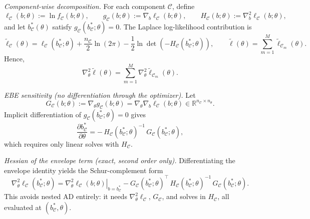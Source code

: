 \documentclass[12pt]{article}
\begin{document}
\medskip
\noindent
\emph{Component-wise decomposition.}
For each component \(\mathcal{C}\), define
\[
\ell_{\mathcal{C}}(b;\theta) := \ln f_{\mathcal{C}}(b;\theta),\qquad
g_{\mathcal{C}}(b;\theta):=\nabla_b \ell_{\mathcal{C}}(b;\theta),\qquad
H_{\mathcal{C}}(b;\theta):=\nabla_b^2 \ell_{\mathcal{C}}(b;\theta),
\]
and let \(b_{\mathcal{C}}^*(\theta)\) satisfy \(g_{\mathcal{C}}(b_{\mathcal{C}}^*;\theta)=0\).
The Laplace log-likelihood contribution is
\[
\tilde\ell_{\mathcal{C}}(\theta)
=
\ell_{\mathcal{C}}(b_{\mathcal{C}}^*;\theta)
+\frac{n_{\mathcal{C}}}{2}\ln(2\pi)
-\frac{1}{2}\ln\det\!\left(-H_{\mathcal{C}}(b_{\mathcal{C}}^*;\theta)\right),
\qquad
\tilde\ell(\theta)=\sum_{m=1}^M \tilde\ell_{\mathcal{C}_m}(\theta).
\]
Hence,
\[
\nabla_\theta^2 \tilde\ell(\theta)=\sum_{m=1}^M \nabla_\theta^2 \tilde\ell_{\mathcal{C}_m}(\theta).
\]

\medskip
\noindent
\emph{EBE sensitivity (no differentiation through the optimizer).}
Let
\[
G_{\mathcal{C}}(b;\theta):=\nabla_\theta g_{\mathcal{C}}(b;\theta)=\nabla_\theta\nabla_b \ell_{\mathcal{C}}(b;\theta)\in\mathbb{R}^{n_{\mathcal{C}}\times n_\theta}.
\]
Implicit differentiation of \(g_{\mathcal{C}}(b_{\mathcal{C}}^*;\theta)=0\) gives
\begin{equation}
\label{eq:db_star_dtheta_hess}
\frac{\partial b_{\mathcal{C}}^*}{\partial\theta}
=
-\,H_{\mathcal{C}}(b_{\mathcal{C}}^*;\theta)^{-1}\,G_{\mathcal{C}}(b_{\mathcal{C}}^*;\theta),
\end{equation}
which requires only linear solves with \(H_{\mathcal{C}}\).

\medskip
\noindent
\emph{Hessian of the envelope term (exact, second order only).}
Differentiating the envelope identity yields the Schur-complement form
\begin{equation}
\label{eq:hess_envelope_schur_final}
\nabla_\theta^2 \ell_{\mathcal{C}}(b_{\mathcal{C}}^*;\theta)
=
\left.\nabla_\theta^2 \ell_{\mathcal{C}}(b;\theta)\right\rvert_{b=b_{\mathcal{C}}^*}
-
G_{\mathcal{C}}(b_{\mathcal{C}}^*;\theta)^\top\,
H_{\mathcal{C}}(b_{\mathcal{C}}^*;\theta)^{-1}\,
G_{\mathcal{C}}(b_{\mathcal{C}}^*;\theta).
\end{equation}
This avoids nested AD entirely: it needs \(\nabla_\theta^2 \ell_{\mathcal{C}}\), \(G_{\mathcal{C}}\), and solves in \(H_{\mathcal{C}}\), all evaluated at \((b_{\mathcal{C}}^*,\theta)\).
\end{document}
